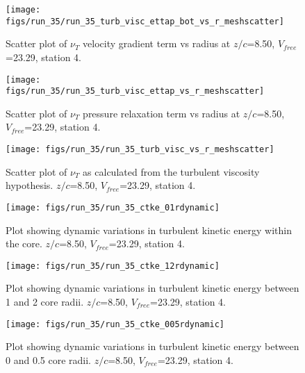 \begin{figure}[H]
\centering
\texttt{[image: figs/run\_35/run\_35\_turb\_visc\_ettap\_bot\_vs\_r\_meshscatter]}
\caption{Scatter plot of $\nu_T$ velocity gradient term vs radius at $z/c$=8.50, $V_{free}$=23.29, station 4.}
\end{figure}


\begin{figure}[H]
\centering
\texttt{[image: figs/run\_35/run\_35\_turb\_visc\_ettap\_vs\_r\_meshscatter]}
\caption{Scatter plot of $\nu_T$ pressure relaxation term vs radius at $z/c$=8.50, $V_{free}$=23.29, station 4.}
\end{figure}


\begin{figure}[H]
\centering
\texttt{[image: figs/run\_35/run\_35\_turb\_visc\_vs\_r\_meshscatter]}
\caption{Scatter plot of $\nu_T$ as calculated from the turbulent viscosity hypothesis. $z/c$=8.50, $V_{free}$=23.29, station 4.}
\end{figure}


\begin{figure}[H]
\centering
\texttt{[image: figs/run\_35/run\_35\_ctke\_01rdynamic]}
\caption{Plot showing dynamic variations in turbulent kinetic energy within the core. $z/c$=8.50, $V_{free}$=23.29, station 4.}
\end{figure}


\begin{figure}[H]
\centering
\texttt{[image: figs/run\_35/run\_35\_ctke\_12rdynamic]}
\caption{Plot showing dynamic variations in turbulent kinetic energy between 1 and 2 core radii. $z/c$=8.50, $V_{free}$=23.29, station 4.}
\end{figure}


\begin{figure}[H]
\centering
\texttt{[image: figs/run\_35/run\_35\_ctke\_005rdynamic]}
\caption{Plot showing dynamic variations in turbulent kinetic energy between 0 and 0.5 core radii. $z/c$=8.50, $V_{free}$=23.29, station 4.}
\end{figure}


